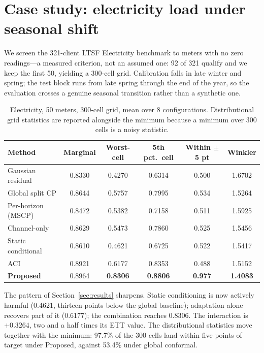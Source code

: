 \documentclass[11pt]{article}
\begin{document}
\section{Case study: electricity load under seasonal shift}\label{sec:casestudy}

We screen the 321-client LTSF Electricity benchmark to meters with no zero readings---a measured criterion, not an assumed one: 92 of 321 qualify and we keep the first 50, yielding a 300-cell grid. Calibration falls in late winter and spring; the test block runs from late spring through the end of the year, so the evaluation crosses a genuine seasonal transition rather than a synthetic one.

\begin{table}[t]\centering\small
\caption{Electricity, 50 meters, 300-cell grid, mean over 8 configurations. Distributional grid statistics are reported alongside the minimum because a minimum over 300 cells is a noisy statistic.}
\label{tab:ecl}
\begin{tabular}{lccccc}
\toprule
Method & Marginal & Worst-cell & 5th pct.\ cell & Within $\pm$5 pt & Winkler\\
\midrule
Gaussian residual & 0.8330 & 0.4270 & 0.6314 & 0.500 & 1.6702\\
Global split CP & 0.8644 & 0.5757 & 0.7995 & 0.534 & 1.5264\\
Per-horizon (MSCP) & 0.8472 & 0.5382 & 0.7158 & 0.511 & 1.5925\\
Channel-only & 0.8629 & 0.5473 & 0.7860 & 0.525 & 1.5456\\
Static conditional & 0.8610 & 0.4621 & 0.6725 & 0.522 & 1.5417\\
ACI & 0.8921 & 0.6177 & 0.8353 & 0.488 & 1.5152\\
\textbf{Proposed} & 0.8964 & \textbf{0.8306} & \textbf{0.8806} & \textbf{0.977} & \textbf{1.4083}\\
\bottomrule
\end{tabular}
\end{table}

The pattern of Section~\ref{sec:results} sharpens. Static conditioning is now actively harmful (0.4621, thirteen points below the global baseline); adaptation alone recovers part of it (0.6177); the combination reaches 0.8306. The interaction is $+0.3264$, two and a half times its ETT value. The distributional statistics move together with the minimum: 97.7\% of the 300 cells land within five points of target under Proposed, against 53.4\% under global conformal.
\end{document}
